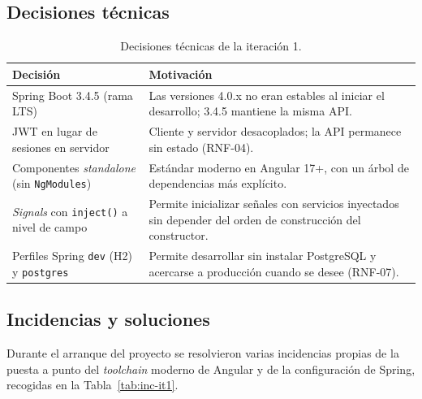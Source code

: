 \subsection{Decisiones técnicas}

\begin{table}[h!]
\centering
\small
\begin{tabular}{|p{5.5cm}|p{8.5cm}|}
\hline
\textbf{Decisión} & \textbf{Motivación} \\ \hline
Spring Boot 3.4.5 (rama LTS) & Las versiones 4.0.x no eran estables al iniciar el desarrollo; 3.4.5 mantiene la misma API. \\ \hline
JWT en lugar de sesiones en servidor & Cliente y servidor desacoplados; la API permanece sin estado (RNF-04). \\ \hline
Componentes \textit{standalone} (sin \texttt{NgModules}) & Estándar moderno en Angular 17+, con un árbol de dependencias más explícito. \\ \hline
\textit{Signals} con \texttt{inject()} a nivel de campo & Permite inicializar señales con servicios inyectados sin depender del orden de construcción del constructor. \\ \hline
Perfiles Spring \texttt{dev} (H2) y \texttt{postgres} & Permite desarrollar sin instalar PostgreSQL y acercarse a producción cuando se desee (RNF-07). \\ \hline
\end{tabular}
\caption{Decisiones técnicas de la iteración 1.}
\label{tab:dec-it1}
\end{table}

\subsection{Incidencias y soluciones}

Durante el arranque del proyecto se resolvieron varias incidencias propias de la puesta a punto del \textit{toolchain} moderno de Angular y de la configuración de Spring, recogidas en la Tabla~\ref{tab:inc-it1}.

